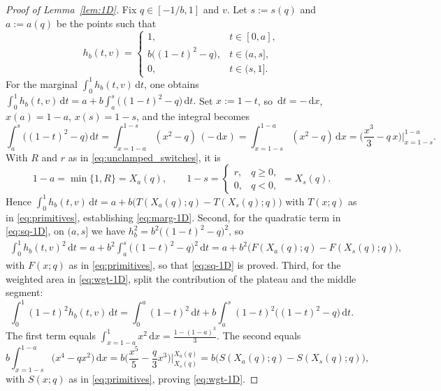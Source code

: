 \documentclass{article}
\newcommand{\1}{\mathds{1}}
\newcommand{\de}{\mathrm{\,d}}
\begin{document}
\begin{proof}[Proof of Lemma~\ref{lem:1D}]
Fix $q\in[-1/b,1]$ and $v$.
Let $s:=s(q)$ and $a:=a(q)$ be the points such that
\[
h_b(t,v)=
\begin{cases}
1,& t\in[0,a],\\[2pt]
b\big((1-t)^2-q\big),& t\in(a,s],\\[2pt]
0,& t\in(s,1].
\end{cases}
\]
For the marginal $\int_0^1 h_b(t,v)\de t$, one obtains
\(
\int_0^1 h_b(t,v)\de t
= a+b\int_a^s \big((1-t)^2-q\big)\de t.
\)
Set $x:=1-t$, so $\de t=-\de x$, $x(a)=1-a$, $x(s)=1-s$, and the integral becomes
\[
\int_a^s \big((1-t)^2-q\big)\de t
=\int_{x=1-a}^{1-s} (x^2-q)\,(-\de x)
=\int_{x=1-s}^{1-a} (x^2-q)\de x
=\Big(\frac{x^3}{3}-q\,x\Big)\Big|_{x=1-s}^{1-a}.
\]
With $R$ and $r$ as in \eqref{eq:unclamped_switches}, it is
\[
1-a=\min\{1,R\}=X_a(q),
\qquad 1-s=\begin{cases}r,&q\ge0,\\0,&q<0,\end{cases}=X_s(q).
\]
Hence
\(
\int_0^1 h_b(t,v)\de t
=a+b\big(T(X_a(q);q)-T(X_s(q);q)\big)
\)
with $T(x;q)$ as in \eqref{eq:primitives}, establishing \eqref{eq:marg-1D}.
Second, for the quadratic term in \eqref{eq:sq-1D}, on $(a,s]$ we have $h_b^2=b^2\big((1-t)^2-q\big)^2$, so
\begin{align*}
\int_0^1 h_b(t,v)^2\de t
= a+b^2\int_a^s \big((1-t)^2-q\big)^2\de t
= a+b^2\big(F(X_a(q);q)-F(X_s(q);q)\big),
\end{align*}
with $F(x;q)$ as in \eqref{eq:primitives}, so that \eqref{eq:sq-1D} is proved.
Third, for the weighted area in \eqref{eq:wgt-1D}, split the contribution of the plateau and the middle segment:
\[
\int_0^1 (1-t)^2 h_b(t,v)\de t
=\int_0^a (1-t)^2\de t + b\int_a^s (1-t)^2\big((1-t)^2-q\big)\de t.
\]
The first term equals $\int_{x=1-a}^{1} x^2\de x=\frac{1-(1-a)^3}{3}$.
The second equals
\[
b\int_{x=1-s}^{1-a} \big(x^4-qx^2\big)\de x
=b\Big(\frac{x^5}{5}-\frac{q}{3}x^3\Big)\Big|_{X_s(q)}^{X_a(q)}
=b\big(S(X_a(q);q)-S(X_s(q);q)\big),
\]
with $S(x;q)$ as in \eqref{eq:primitives}, proving \eqref{eq:wgt-1D}.


\end{proof}
\end{document}
